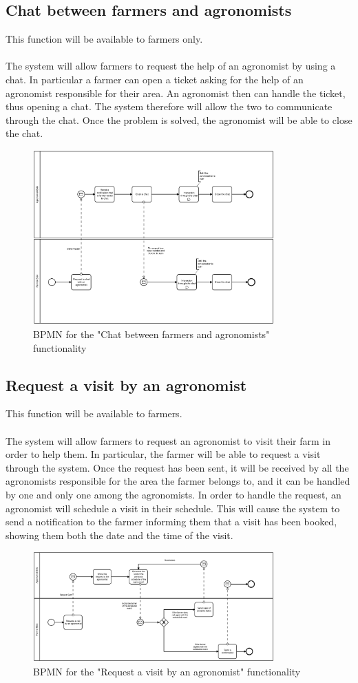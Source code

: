 \documentclass[10pt]{report}
\begin{document}
\subsection{Chat between farmers and agronomists}
This function will be available to farmers only.\\ \\
The system will allow farmers to request the help of an agronomist by using a chat. In particular a farmer can open a ticket asking for the help of an agronomist responsible for their area. An agronomist then can handle the ticket, thus opening a chat. The system therefore will allow the two to communicate through the chat. Once the problem is solved, the agronomist will be able to close the chat.
\begin{figure}[H]
    \centering
    \includegraphics[width=350px]{BPMN/BPMN 224.jpg}
    \caption{BPMN for the "Chat between farmers and agronomists" functionality}
\end{figure}
\subsection{Request a visit by an agronomist}
This function will be available to farmers.\\ \\
The system will allow farmers to request an agronomist to visit their farm in order to help them. In particular, the farmer will be able to request a visit through the system. Once the request has been sent, it will be received by all the agronomists responsible for the area the farmer belongs to, and it can be handled by one and only one among the agronomists. In order to handle the request, an agronomist will schedule a visit in their schedule. This will cause the system to send a notification to the farmer informing them that a visit has been booked, showing them both the date and the time of the visit.
\begin{figure}[H]
    \centering
    \includegraphics[width=350px]{BPMN/BPMN 225.jpg}
    \caption{BPMN for the "Request a visit by an agronomist" functionality}
\end{figure}
\end{document}
